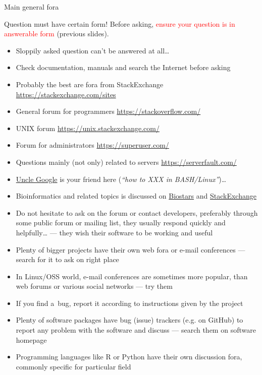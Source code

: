 \documentclass[compress, xelatex, 11pt, xcolor=svgnames, aspectratio=169,
	hyperref={
		bookmarks=true,
		unicode=true,
		colorlinks=true,
		pdftitle={Linux, command line and MetaCentrum},
		plainpages=false,
		pdfauthor={Vojtech Zeisek},
		pdfsubject={Course about use of Linux command line, writing shell scripts and using MetaCentrum of CESNET},
		pdfcreator={XeLaTeX},
		pdfkeywords={Linux, GNU, BASH, shell, command line, MetaCentrum},
		linkcolor=DarkRed, %
		anchorcolor=DarkBlue, %
		citecolor=Indigo, %
		filecolor=NavyBlue, %
		menucolor=DarkMagenta, %
		urlcolor=DarkBlue, %
		},
	url={hyphens, lowtilde} %
	]{beamer}
\renewcommand{\alert}[1]{\textcolor{red}{#1}}
\begin{document}
\begin{frame}[allowframebreaks]{Main general fora}
	\begin{block}{Question must have certain form!}
			Before asking, \alert{ensure your question is in answerable form} (previous slides).
		\begin{itemize}
			\item Sloppily asked question can't be answered at all\ldots
			\item Check documentation, manuals and search the Internet before asking
		\end{itemize}
	\end{block}
	\begin{itemize}
		\item Probably the best are fora from StackExchange \url{https://stackexchange.com/sites}
		\item General forum for programmers \url{https://stackoverflow.com/}
		\item UNIX forum \url{https://unix.stackexchange.com/}
		\item Forum for administrators \url{https://superuser.com/}
		\item Questions mainly (not only) related to servers \url{https://serverfault.com/}
		\item \href{https://www.startpage.com/}{Uncle Google} is your friend here (\textit{\enquote{how to XXX in BASH/Linux}})\ldots
		\item Bioinformatics and related topics is discussed on \href{https://www.biostars.org/}{Biostars} and \href{https://bioinformatics.stackexchange.com/}{StackExchange}
		\item Do not hesitate to ask on the forum or contact developers, preferably through some public forum or mailing list, they usually respond quickly and helpfully\ldots{ }--- they wish their software to be working and useful
		\item Plenty of bigger projects have their own web fora or e-mail conferences --- search for it to ask on right place
		\item In Linux/OSS world, e-mail conferences are sometimes more popular, than web forums or various social networks --- try them
		\item If you find a~bug, report it according to instructions given by the project
		\item Plenty of software packages have bug (issue) trackers (e.g. on GitHub) to report any problem with the software and discuss --- search them on software homepage
		\item Programming languages like R or Python have their own discussion fora, commonly specific for particular field
	\end{itemize}
\end{frame}
\end{document}
